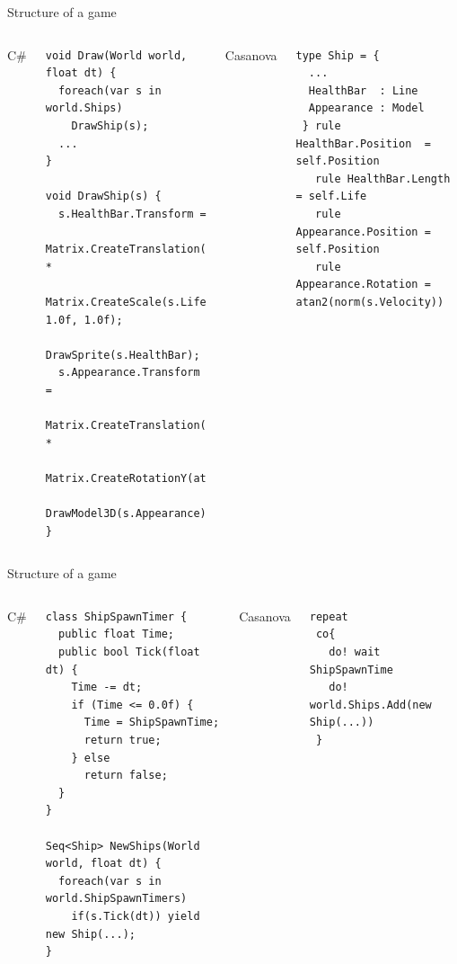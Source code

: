 \documentclass{beamer}
\begin{document}
\begin{frame}[fragile]{Structure of a game}
\begin{columns}
\column{5cm}
\large{C\#}
\begin{lstlisting}
void Draw(World world, float dt) {
  foreach(var s in world.Ships)
    DrawShip(s);
  ...
}

void DrawShip(s) {
  s.HealthBar.Transform = 
    Matrix.CreateTranslation(s.Position) *
    Matrix.CreateScale(s.Life, 1.0f, 1.0f);
  DrawSprite(s.HealthBar);
  s.Appearance.Transform = 
    Matrix.CreateTranslation(s.Position) *
    Matrix.CreateRotationY(atan2(norm(s.Velocity)));
  DrawModel3D(s.Appearance);
}
\end{lstlisting}
\column{5cm}
\large{Casanova}
\begin{lstlisting}
type Ship = {
  ...
  HealthBar  : Line
  Appearance : Model
 } rule HealthBar.Position  = self.Position
   rule HealthBar.Length    = self.Life
   rule Appearance.Position = self.Position
   rule Appearance.Rotation = atan2(norm(s.Velocity))
\end{lstlisting}
\end{columns}
\end{frame}

\begin{frame}[fragile]{Structure of a game}
\begin{columns}
\column{5cm}
\large{C\#}
\begin{lstlisting}
class ShipSpawnTimer {
  public float Time;
  public bool Tick(float dt) {
    Time -= dt;
    if (Time <= 0.0f) {
      Time = ShipSpawnTime;
      return true;
    } else
      return false;
  }
}

Seq<Ship> NewShips(World world, float dt) {
  foreach(var s in world.ShipSpawnTimers)
    if(s.Tick(dt)) yield new Ship(...);
}
\end{lstlisting}
\column{5cm}
\large{Casanova}
\begin{lstlisting}
repeat
 co{
   do! wait ShipSpawnTime
   do! world.Ships.Add(new Ship(...))
 }
\end{lstlisting}
\end{columns}
\end{frame}
\end{document}
